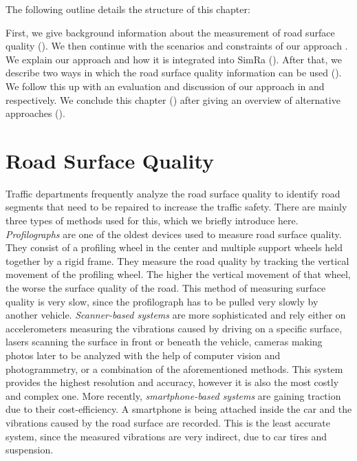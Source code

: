 The following outline details the structure of this chapter:

First, we give background information about the measurement of road surface quality ().
We then continue with the scenarios and constraints of our approach .
We explain our approach and how it is integrated into SimRa ().
After that, we describe two ways in which the road surface quality information can be used ().
We follow this up with an evaluation and discussion of our approach in  and  respectively.
We conclude this chapter () after giving an overview of alternative approaches ().

\section{Road Surface Quality}
\label{sec:surface_quality_background}
Traffic departments frequently analyze the road surface quality to identify road segments that need to be repaired to increase the traffic safety.
There are mainly three types of methods used for this, which we briefly introduce here.
\textit{Profilographs} are one of the oldest devices used to measure road surface quality.
They consist of a profiling wheel in the center and multiple support wheels held together by a rigid frame.
They measure the road quality by tracking the vertical movement of the profiling wheel.
The higher the vertical movement of that wheel, the worse the surface quality of the road.
This method of measuring surface quality is very slow, since the profilograph has to be pulled very slowly by another vehicle.
\textit{Scanner-based systems} are more sophisticated and rely either on accelerometers measuring the vibrations caused by driving on a specific surface, lasers scanning the surface in front or beneath the vehicle, cameras making photos later to be analyzed with the help of computer vision and photogrammetry, or a combination of the aforementioned methods.
This system provides the highest resolution and accuracy, however it is also the most costly and complex one.
More recently, \textit{smartphone-based systems} are gaining traction due to their cost-efficiency.
A smartphone is being attached inside the car and the vibrations caused by the road surface are recorded.
This is the least accurate system, since the measured vibrations are very indirect, due to car tires and suspension.

